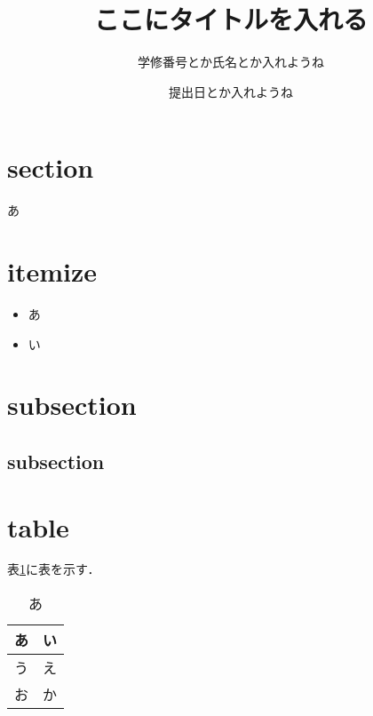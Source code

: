 \documentclass[11pt, a4paper]{jsarticle}
\title{
ここにタイトルを入れる}
\author{
学修番号とか氏名とか入れようね
}
\begin{document}
\date{提出日とか入れようね}
\maketitle
\section{section} %
あ

\section{itemize}
\begin{itemize} %
\item[(1)]あ
\item[(2)] い
\end{itemize}

\section{subsection}
\subsection{subsection} %

\section{table}
表\ref{table}に表を示す． %
\begin{table} [H] %
\caption{あ} 
\centering
\begin{tabular}{rr}\\ \hline
あ&い\\ \hline
う&え\\ 
お&か\\ \hline
\end{tabular}
\label{table}  
\end{table}
\end{document}
